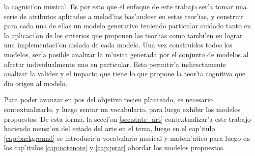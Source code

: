 la cognici'on musical. Es por esto que el enfoque de este trabajo ser'a tomar una serie de atributos aplicados a melod'ias bas'andose en estas teor'ias, 
y construir para cada una de ellas un modelo generativo teniendo particular cuidado
tanto en la aplicaci'on de los criterios que proponen las teor'ias como tambi'en en lograr una implementaci'on aislada de cada modelo. 
Una vez construidos todos los modelos, ser'a posible analizar la m'usica generada por el conjunto de modelos al afectar individualmente uno en particular. Esto
permitir'a indirectamente analizar la validez y el impacto que tiene lo que propone la teor'ia cognitiva que dio origen al modelo.

Para poder avanzar en pos del objetivo recien planteado, es necesario contextualizarlo, y luego sentar un vocabulario, para luego exhibir los
modelos propuestos. De esta forma, la secci'on \ref{sec:state_art} contextualizar'a este trabajo haciendo mensi'on del estado del arte 
en el tema, luego en el cap'itulo \ref{cap:background} se introducir'a vocabulario musical y matem'atico 
para luego en los cap'itulos \ref{cap:notenote} y \ref{cap:jerar} abordar los modelos propuestos.

